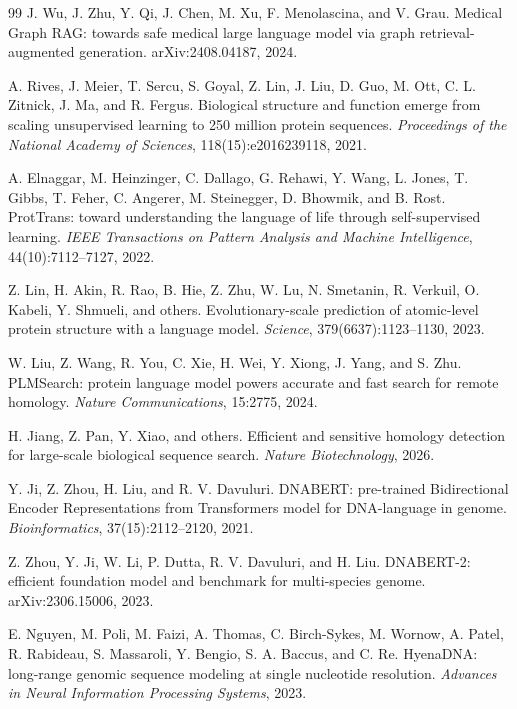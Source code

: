 \documentclass[11pt]{article}
\begin{document}
\begin{thebibliography}{99}
J. Wu, J. Zhu, Y. Qi, J. Chen, M. Xu, F. Menolascina, and V. Grau.
Medical Graph RAG: towards safe medical large language model via graph retrieval-augmented generation.
arXiv:2408.04187, 2024.

A. Rives, J. Meier, T. Sercu, S. Goyal, Z. Lin, J. Liu, D. Guo, M. Ott, C. L. Zitnick, J. Ma, and R. Fergus.
Biological structure and function emerge from scaling unsupervised learning to 250 million protein sequences.
\emph{Proceedings of the National Academy of Sciences}, 118(15):e2016239118, 2021.

A. Elnaggar, M. Heinzinger, C. Dallago, G. Rehawi, Y. Wang, L. Jones, T. Gibbs, T. Feher, C. Angerer, M. Steinegger, D. Bhowmik, and B. Rost.
ProtTrans: toward understanding the language of life through self-supervised learning.
\emph{IEEE Transactions on Pattern Analysis and Machine Intelligence}, 44(10):7112--7127, 2022.

Z. Lin, H. Akin, R. Rao, B. Hie, Z. Zhu, W. Lu, N. Smetanin, R. Verkuil, O. Kabeli, Y. Shmueli, and others.
Evolutionary-scale prediction of atomic-level protein structure with a language model.
\emph{Science}, 379(6637):1123--1130, 2023.

W. Liu, Z. Wang, R. You, C. Xie, H. Wei, Y. Xiong, J. Yang, and S. Zhu.
PLMSearch: protein language model powers accurate and fast search for remote homology.
\emph{Nature Communications}, 15:2775, 2024.

H. Jiang, Z. Pan, Y. Xiao, and others.
Efficient and sensitive homology detection for large-scale biological sequence search.
\emph{Nature Biotechnology}, 2026.

Y. Ji, Z. Zhou, H. Liu, and R. V. Davuluri.
DNABERT: pre-trained Bidirectional Encoder Representations from Transformers model for DNA-language in genome.
\emph{Bioinformatics}, 37(15):2112--2120, 2021.

Z. Zhou, Y. Ji, W. Li, P. Dutta, R. V. Davuluri, and H. Liu.
DNABERT-2: efficient foundation model and benchmark for multi-species genome.
arXiv:2306.15006, 2023.

E. Nguyen, M. Poli, M. Faizi, A. Thomas, C. Birch-Sykes, M. Wornow, A. Patel, R. Rabideau, S. Massaroli, Y. Bengio, S. A. Baccus, and C. Re.
HyenaDNA: long-range genomic sequence modeling at single nucleotide resolution.
\emph{Advances in Neural Information Processing Systems}, 2023.


\end{thebibliography}
\end{document}
